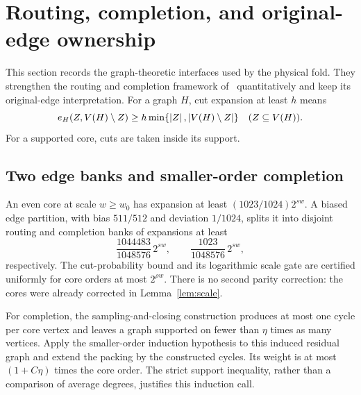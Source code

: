 \section{Routing, completion, and original-edge ownership}\label{sec:routing}
This section records the graph-theoretic interfaces used by the physical
fold. They strengthen the routing and completion framework
of~\cite{OAI2026} quantitatively and keep its original-edge interpretation.
For a graph $H$, cut expansion at least $h$ means
\[
 e_H(Z,V(H)\setminus Z)\ge h\min\{\left|Z\right|,\left|V(H)\setminus Z\right|\}
                         \quad(Z\subseteq V(H)).
\]
For a supported core, cuts are taken inside its support.

\subsection{Two edge banks and smaller-order completion}
An even core at scale $w\ge w_0$ has expansion at least
$(1023/1024)2^{sw}$. A biased edge partition, with bias $511/512$ and
deviation $1/1024$, splits it into disjoint routing and completion banks
of expansions at least
\begin{equation}\label{eq:banks}
        \frac{1044483}{1048576}\,2^{sw},\qquad
        \frac{1023}{1048576}\,2^{sw},
\end{equation}
respectively. The cut-probability bound and its logarithmic scale gate
are certified uniformly for core orders at most $2^{\rho w}$.
There is no second parity correction: the cores were already corrected
in Lemma~\ref{lem:scale}.

For completion, the sampling-and-closing construction produces at most
one cycle per core vertex and leaves a graph supported on fewer than
$\eta$ times as many vertices. Apply the smaller-order induction hypothesis
to this induced residual graph and extend the packing by the constructed
cycles. Its weight is at most $(1+C\eta)$ times the core order. The strict
support inequality, rather than a comparison of average degrees, justifies
this induction call.

